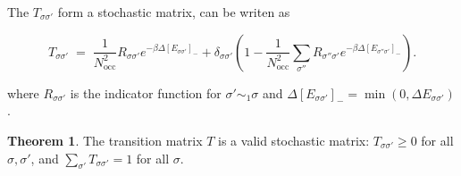 \documentclass[12pt, a4paper]{article}
\theoremstyle{definition}
\newtheorem{theorem}{Theorem}[section]
\newcommand{\betaT}{\beta}
\begin{document}
The $T_{\sigma \sigma'}$ form a stochastic matrix, can be writen as

\begin{equation}
    T_{\sigma \sigma'} \;=\; \dfrac{1}{N_{\mathrm{occ}}^2} R_{\sigma \sigma'} e^{-\betaT \Delta [E_{\sigma \sigma'}]_-} + \delta_{\sigma \sigma'} \left(1 - \dfrac{1}{N_{\mathrm{occ}}^2}  \sum_{\sigma'' }  R_{\sigma'' \sigma'} e^{-\betaT \Delta [E_{\sigma'' \sigma'}]_-}\right) .
    \label{eq:transition_matrix}
\end{equation}

where $R_{\sigma \sigma'}$ is the indicator function for $\sigma' \sim_1 \sigma$ and $\Delta [E_{\sigma \sigma'}]_- = \min(0, \Delta E_{\sigma \sigma'})$.

\begin{theorem}
    The transition matrix $T$ is a valid stochastic matrix: $T_{\sigma \sigma'} \geq 0$ for all $\sigma, \sigma'$, and $\sum_{\sigma'} T_{\sigma \sigma'} = 1$ for all $\sigma$.
\end{theorem}
\end{document}
